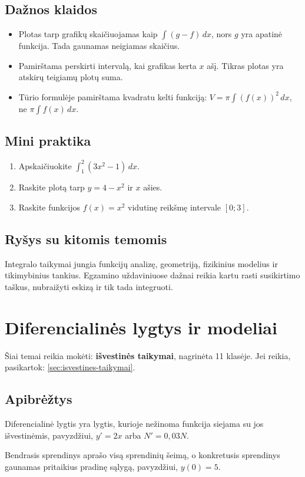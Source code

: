 \subsection{Dažnos klaidos}
\begin{itemize}
\item Plotas tarp grafikų skaičiuojamas kaip \(\int (g-f)\,dx\), nors \(g\) yra apatinė funkcija. Tada gaunamas neigiamas skaičius.
\item Pamirštama perskirti intervalą, kai grafikas kerta \(x\) ašį. Tikras plotas yra atskirų teigiamų plotų suma.
\item Tūrio formulėje pamirštama kvadratu kelti funkciją: \(V=\pi\int (f(x))^2\,dx\), ne \(\pi\int f(x)\,dx\).
\end{itemize}

\subsection{Mini praktika}
\begin{enumerate}[label=\alph*)]
\item Apskaičiuokite \(\int_1^2 (3x^2-1)\,dx\).
\item Raskite plotą tarp \(y=4-x^2\) ir \(x\) ašies.
\item Raskite funkcijos \(f(x)=x^2\) vidutinę reikšmę intervale \([0;3]\).
\end{enumerate}

\subsection{Ryšys su kitomis temomis}
Integralo taikymai jungia funkcijų analizę, geometriją, fizikinius modelius ir tikimybinius tankius. Egzamino uždaviniuose dažnai reikia kartu rasti susikirtimo taškus, nubraižyti eskizą ir tik tada integruoti.

\section{Diferencialinės lygtys ir modeliai}\label{sec:diferencialines-lygtys-ir-modeliai}

\begin{tcolorbox}[title=Primename iš ankstesnių klasių, colback=yellow!10]
Šiai temai reikia mokėti: \textbf{išvestinės taikymai}, nagrinėta 11 klasėje.
Jei reikia, pasikartok: \ref{sec:isvestines-taikymai}.
\end{tcolorbox}

\subsection{Apibrėžtys}
\begin{apibreztis}
Diferencialinė lygtis yra lygtis, kurioje nežinoma funkcija siejama su jos išvestinėmis, pavyzdžiui, \(y'=2x\) arba \(N'=0{,}03N\).
\end{apibreztis}
\begin{apibreztis}
Bendrasis sprendinys aprašo visą sprendinių šeimą, o konkretusis sprendinys gaunamas pritaikius pradinę sąlygą, pavyzdžiui, \(y(0)=5\).
\end{apibreztis}

